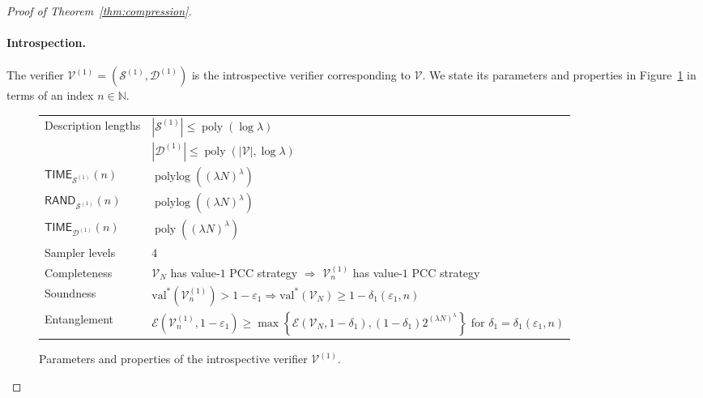 \documentclass[11pt]{article}
\theoremstyle{definition}
\newcommand{\N}{\ensuremath{\mathbb{N}}}
\DeclareMathOperator{\poly}{poly}
\newcommand{\val}{\ensuremath{\mathrm{val}}}
\newcommand{\eps}{\varepsilon}
\DeclareMathOperator{\polylog}{polylog}
\newcommand{\abs}[1]{\left\vert {#1} \right\vert}
\newcommand{\sampler}{\mathcal{S}}
\newcommand{\decider}{\mathcal{D}}
\newcommand{\verifier}{\mathcal{V}}
\newcommand{\Ent}{\mathscr{E}}
\newcommand{\TIME}{\mathsf{TIME}}
\newcommand{\RAND}{\mathsf{RAND}}
\begin{document}
\begin{proof}[Proof of Theorem~\ref{thm:compression}]
  \paragraph{Introspection.}
  The verifier $\verifier^{(1)} = (\sampler^{(1)},\decider^{(1)})$ is the
  introspective verifier corresponding to $\verifier$.
  We state its parameters and properties in Figure~\ref{tab:intro} in terms of
  an index $n \in \N$.

  \begin{figure}[H]
    \begin{center}
      \renewcommand{\arraystretch}{1.2}
      \begin{tabularx}{0.8\textwidth}{l X}
        \toprule \multirow{2}{*}{Description lengths}
        & $|\sampler^{(1)}| \leq \poly(\log\lambda)$ \\
        & $|\decider^{(1)}| \leq \poly(\abs{\verifier}, \log \lambda)$ \\
        $\TIME_{\sampler^{(1)}}(n)$
        & $\polylog \left ( (\lambda N)^\lambda \right)$ \\
        $\RAND_{\sampler^{(1)}}(n)$
        & $\polylog \left ((\lambda N)^\lambda \right)$ \\
        $\TIME_{\decider^{(1)}}(n)$
        & $\poly \left ((\lambda N)^\lambda\right)$  \\
        Sampler levels & $4$ \\
        Completeness & $\verifier_N$ has value-$1$ PCC strategy $\Rightarrow$
        $\verifier^{(1)}_n$ has value-$1$ PCC strategy \\
        Soundness & $\val^*(\verifier^{(1)}_n) > 1 - \eps_1 \Rightarrow
        \val^*(\verifier_N) \geq 1 - \delta_1(\eps_1,n)$ \\
        Entanglement & $\Ent(\verifier_n^{(1)},1 - \eps_1) \geq \max \left \{
          \Ent(\verifier_N,1 - \delta_1), (1 - \delta_1)
          2^{(\lambda N)^\lambda} \right \}$
        for $\delta_1 = \delta_1(\eps_1,n)$ \\
        \bottomrule
      \end{tabularx}
      \caption{Parameters and properties of the introspective verifier
        $\verifier^{(1)}$.}
      \label{tab:intro}
    \end{center}
  \end{figure}


\end{proof}
\end{document}
